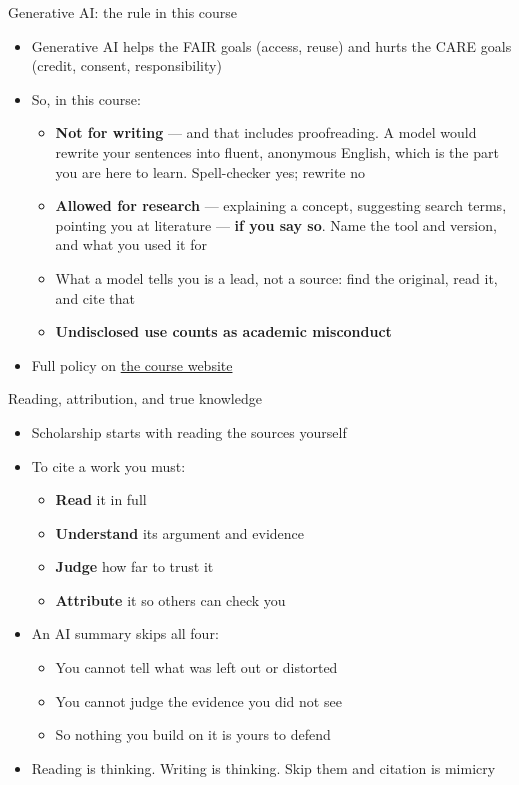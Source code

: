 \documentclass[aspectratio=169]{beamer}
\begin{document}
\begin{frame}{Generative AI: the rule in this course}
\begin{itemize}
  \item Generative AI helps the FAIR goals (access, reuse) and hurts the CARE
    goals (credit, consent, responsibility)
  \item So, in this course:
    \begin{itemize}
      \item \textbf{Not for writing} --- and that includes proofreading.
        A model would rewrite your sentences into fluent, anonymous English,
        which is the part you are here to learn.  Spell-checker yes; rewrite
        no
      \item \textbf{Allowed for research} --- explaining a concept, suggesting
        search terms, pointing you at literature --- \textbf{if you say so}.
        Name the tool and version, and what you used it for
      \item What a model tells you is a lead, not a source: find the original,
        read it, and cite that
      \item \textbf{Undisclosed use counts as academic misconduct}
    \end{itemize}
  \item Full policy on
    \href{https://bond-lab.github.io/Open-Knowledge/}{the course website}
\end{itemize}
\end{frame}

\begin{frame}{Reading, attribution, and true knowledge}
\begin{itemize}
  \item Scholarship starts with reading the sources yourself
  \item To cite a work you must:
    \begin{itemize}
      \item \textbf{Read} it in full
      \item \textbf{Understand} its argument and evidence
      \item \textbf{Judge} how far to trust it
      \item \textbf{Attribute} it so others can check you
    \end{itemize}
  \item An AI summary skips all four:
    \begin{itemize}
      \item You cannot tell what was left out or distorted
      \item You cannot judge the evidence you did not see
      \item So nothing you build on it is yours to defend
    \end{itemize}
  \item Reading is thinking.  Writing is thinking.  Skip them and citation is mimicry
\end{itemize}
\end{frame}
\end{document}
